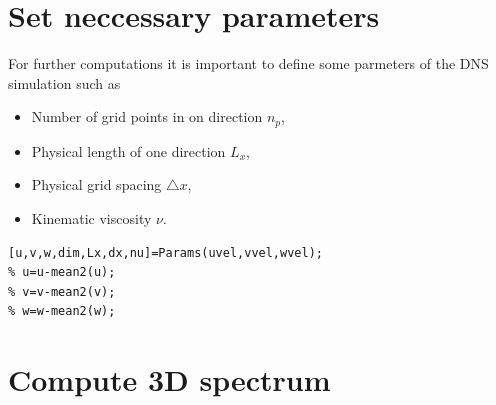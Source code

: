 \documentclass[preprint,12pt,ntfdMod]{elsarticle}
\begin{document}
\section{Set neccessary parameters}

\begin{par}

For further computations it is important to define some parmeters of the
DNS simulation such as
\begin{itemize}
  \item Number of grid points in on direction $n_{p}$,
  \item Physical length of one direction $L_x$,
  \item Physical grid spacing $\triangle x$,
  \item Kinematic viscosity $\nu$.
\end{itemize}

\end{par} \vspace{1em}
\begin{lstlisting}
[u,v,w,dim,Lx,dx,nu]=Params(uvel,vvel,wvel);
% u=u-mean2(u);
% v=v-mean2(v);
% w=w-mean2(w);
\end{lstlisting}
\begin{par}



\end{par} \vspace{1em}


\section{Compute 3D spectrum}
\end{document}
